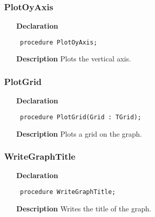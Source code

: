 \documentclass[12pt,a4paper,oneside]{report}
\newcommand{\declarationitem}[1]{\textbf{#1}}
\newcommand{\descriptiontitle}[1]{\textbf{#1}}
\newcommand{\code}[1]{\texttt{#1}}
\begin{document}
\subsubsection{PlotOyAxis}
\label{uplot-PlotOyAxis}
\begin{itemize}\item[\declarationitem{Declaration}\hfill]
	\begin{flushleft}
		\code{
			procedure PlotOyAxis;}
		
	\end{flushleft}
	
	\par
	\item[\descriptiontitle{Description}]
	Plots the vertical axis.
	
\end{itemize}
\subsubsection{PlotGrid}
\label{uplot-PlotGrid}
\begin{itemize}\item[\declarationitem{Declaration}\hfill]
	\begin{flushleft}
		\code{
			procedure PlotGrid(Grid : TGrid);}
		
	\end{flushleft}
	
	\par
	\item[\descriptiontitle{Description}]
	Plots a grid on the graph.
	
\end{itemize}
\subsubsection{WriteGraphTitle}
\label{uplot-WriteGraphTitle}
\begin{itemize}\item[\declarationitem{Declaration}\hfill]
	\begin{flushleft}
		\code{
			procedure WriteGraphTitle;}
		
	\end{flushleft}
	
	\par
	\item[\descriptiontitle{Description}]
	Writes the title of the graph.
	
\end{itemize}
\end{document}
